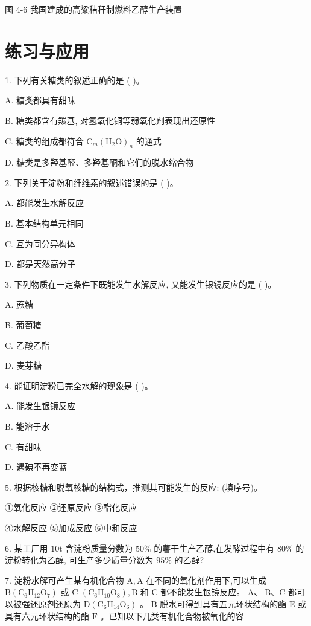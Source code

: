 \documentclass[10pt]{article}
\begin{document}
图 4-6 我国建成的高粱秸秆制燃料乙醇生产装置

\section*{练习与应用}

1. 下列有关糖类的叙述正确的是 ( )。

A. 糖类都具有甜味

B. 糖类都含有羰基, 对氢氧化铜等弱氧化剂表现出还原性

C. 糖类的组成都符合 \({\mathrm{C}}_{m}{\left( {\mathrm{H}}_{2}\mathrm{O}\right) }_{n}\) 的通式

D. 糖类是多羟基醛、多羟基酮和它们的脱水缩合物

2. 下列关于淀粉和纤维素的叙述错误的是 ( )。

A. 都能发生水解反应

B. 基本结构单元相同

C. 互为同分异构体

D. 都是天然高分子

3. 下列物质在一定条件下既能发生水解反应, 又能发生银镜反应的是 ( )。

A. 蔗糖

B. 葡萄糖

C. 乙酸乙酯

D. 麦芽糖

4. 能证明淀粉已完全水解的现象是 ( )。

A. 能发生银镜反应

B. 能溶于水

C. 有甜味

D. 遇碘不再变蓝

5. 根据核糖和脱氧核糖的结构式，推测其可能发生的反应: (填序号)。

①氧化反应 ②还原反应 ③酯化反应

④水解反应 ⑤加成反应 ⑥中和反应

6. 某工厂用 \({10}\mathrm{t}\) 含淀粉质量分数为 \({50}\%\) 的薯干生产乙醇,在发酵过程中有 \({80}\%\) 的淀粉转化为乙醇, 可生产多少质量分数为 \({95}\%\) 的乙醇?

7. 淀粉水解可产生某有机化合物 \(\mathrm{A},\mathrm{A}\) 在不同的氧化剂作用下,可以生成 \(\mathrm{B}\left( {{\mathrm{C}}_{6}{\mathrm{H}}_{12}{\mathrm{O}}_{7}}\right)\) 或 \(\mathrm{C}\) \(\left( {{\mathrm{C}}_{6}{\mathrm{H}}_{10}{\mathrm{O}}_{8}}\right) ,\mathrm{B}\) 和 \(\mathrm{C}\) 都不能发生银镜反应。 \(\mathrm{A}\text{、}\mathrm{\;B}\text{、}\mathrm{C}\) 都可以被强还原剂还原为 \(\mathrm{D}\left( {{\mathrm{C}}_{6}{\mathrm{H}}_{14}{\mathrm{O}}_{6}}\right)\) 。 \(\mathrm{B}\) 脱水可得到具有五元环状结构的酯 \(\mathrm{E}\) 或具有六元环状结构的酯 \(\mathrm{F}\) 。已知以下几类有机化合物被氧化的容
\end{document}
